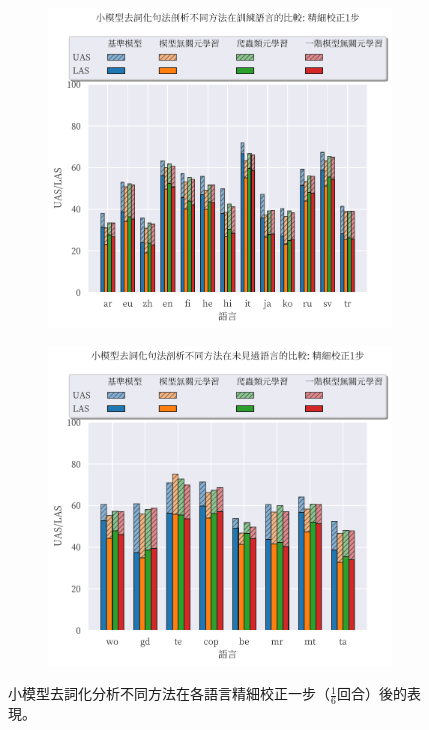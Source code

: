 \begin{figure}[!htbp]
    \centering
    \begin{subfigure}[t]{0.75\textwidth}
        \centering
        \includegraphics[width=\textwidth]{figs/chapter3/delex/bar_small_one_step_train_langs.pdf}
    \end{subfigure}
    \vspace{-12pt}
    \begin{subfigure}[t]{0.75\textwidth}
        \centering
        \includegraphics[width=\textwidth]{figs/chapter3/delex/bar_small_one_step_test_langs.pdf}
    \end{subfigure}
    \caption{小模型去詞化分析不同方法在各語言精細校正一步（$\frac{1}{6}$回合）後的表現。}
    \label{fig:bar_small_one_step}
\end{figure}